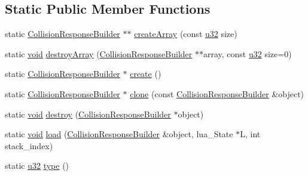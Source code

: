 \subsection*{Static Public Member Functions}
\begin{DoxyCompactItemize}
\item 
static \mbox{\hyperlink{classnjli_1_1_collision_response_builder}{Collision\+Response\+Builder}} $\ast$$\ast$ \mbox{\hyperlink{classnjli_1_1_collision_response_builder_a6aa08e1e478f588b3f7672b84dcf704b}{create\+Array}} (const \mbox{\hyperlink{_util_8h_a10e94b422ef0c20dcdec20d31a1f5049}{u32}} size)
\item 
static \mbox{\hyperlink{_thread_8h_af1e856da2e658414cb2456cb6f7ebc66}{void}} \mbox{\hyperlink{classnjli_1_1_collision_response_builder_aa7f266a43e3f731c87c81cf79212f639}{destroy\+Array}} (\mbox{\hyperlink{classnjli_1_1_collision_response_builder}{Collision\+Response\+Builder}} $\ast$$\ast$array, const \mbox{\hyperlink{_util_8h_a10e94b422ef0c20dcdec20d31a1f5049}{u32}} size=0)
\item 
static \mbox{\hyperlink{classnjli_1_1_collision_response_builder}{Collision\+Response\+Builder}} $\ast$ \mbox{\hyperlink{classnjli_1_1_collision_response_builder_ac962560ad9fab5686416c4033a059d71}{create}} ()
\item 
static \mbox{\hyperlink{classnjli_1_1_collision_response_builder}{Collision\+Response\+Builder}} $\ast$ \mbox{\hyperlink{classnjli_1_1_collision_response_builder_a7fdea96fbff8d82972b5ca78a0bb6741}{clone}} (const \mbox{\hyperlink{classnjli_1_1_collision_response_builder}{Collision\+Response\+Builder}} \&object)
\item 
static \mbox{\hyperlink{_thread_8h_af1e856da2e658414cb2456cb6f7ebc66}{void}} \mbox{\hyperlink{classnjli_1_1_collision_response_builder_a3e610ab2c2e7a753796970880f8ee784}{destroy}} (\mbox{\hyperlink{classnjli_1_1_collision_response_builder}{Collision\+Response\+Builder}} $\ast$object)
\item 
static \mbox{\hyperlink{_thread_8h_af1e856da2e658414cb2456cb6f7ebc66}{void}} \mbox{\hyperlink{classnjli_1_1_collision_response_builder_a3ff2f19c040c5ae010be41a8d90b3a9c}{load}} (\mbox{\hyperlink{classnjli_1_1_collision_response_builder}{Collision\+Response\+Builder}} \&object, lua\+\_\+\+State $\ast$L, int stack\+\_\+index)
\item 
static \mbox{\hyperlink{_util_8h_a10e94b422ef0c20dcdec20d31a1f5049}{u32}} \mbox{\hyperlink{classnjli_1_1_collision_response_builder_adc227ba24772b6efb0591ede596ea0c2}{type}} ()
\end{DoxyCompactItemize}
